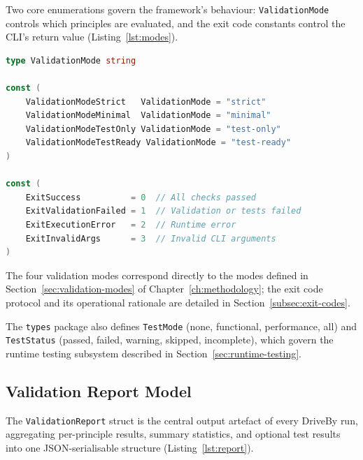 Two core enumerations govern the framework's behaviour: \texttt{ValidationMode} controls which principles are evaluated, and the exit code constants control the CLI's return value (Listing~\ref{lst:modes}).

\begin{lstlisting}[language=Go,float=htbp,caption={ValidationMode and exit code definitions (\texttt{types/modes.go}).},label={lst:modes}]
type ValidationMode string

const (
    ValidationModeStrict   ValidationMode = "strict"
    ValidationModeMinimal  ValidationMode = "minimal"
    ValidationModeTestOnly ValidationMode = "test-only"
    ValidationModeTestReady ValidationMode = "test-ready"
)

const (
    ExitSuccess          = 0  // All checks passed
    ExitValidationFailed = 1  // Validation or tests failed
    ExitExecutionError   = 2  // Runtime error
    ExitInvalidArgs      = 3  // Invalid CLI arguments
)
\end{lstlisting}

The four validation modes correspond directly to the modes defined in Section~\ref{sec:validation-modes} of Chapter~\ref{ch:methodology}; the exit code protocol and its operational rationale are detailed in Section~\ref{subsec:exit-codes}.

The \texttt{types} package also defines \texttt{TestMode} (none, functional, performance, all) and \texttt{TestStatus} (passed, failed, warning, skipped, incomplete), which govern the runtime testing subsystem described in Section~\ref{sec:runtime-testing}.

\subsection{Validation Report Model}
\label{subsec:report-model}

The \texttt{ValidationReport} struct is the central output artefact of every DriveBy run, aggregating per-principle results, summary statistics, and optional test results into one JSON-serialisable structure (Listing~\ref{lst:report}).

